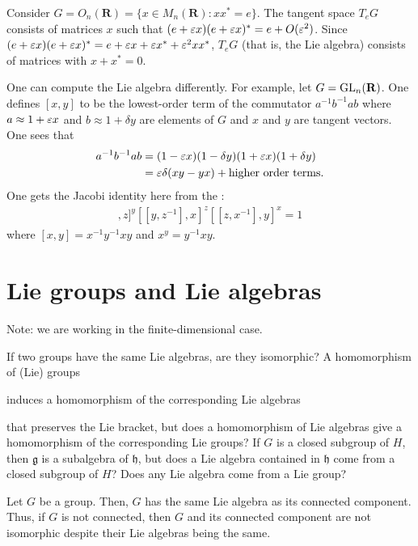 \documentclass [11 pt, twoside] {article}
\begin{document}
\begin{example}[ ]\label{}\text{}
Consider $G = O_{n}(\mathbf{R}) = \{x\in M_{n}(\mathbf{R}) : xx^{*}=e\}$. 
The tangent space $T_{e}G$ consists of matrices $x$ such that $(e+\varepsilon x)(e+\varepsilon x) ^{*}=  e + O(\varepsilon^{2})$.
Since $(e+\varepsilon x) (e+\varepsilon x) ^{*} = e + \varepsilon x + \varepsilon x ^{*} + \varepsilon ^{2}xx^{*}$, $T_{e}G$ (that is, the Lie algebra) consists of matrices with $x+x^{*}=0$.
\end{example}

One can compute the Lie algebra differently.
For example, let $G=\operatorname{GL}_{n}(\mathbf{R})$.
One defines $[x,y]$ to be the lowest-order term of the commutator $a^{-1}b^{-1}ab$ where $a\approx 1+\varepsilon x$ and $b\approx 1+\delta y$ are elements of $G$ and $x$ and $y$ are tangent vectors. 
One sees that
\begin{align*}
	a^{-1}b^{-1}ab &= (1-\varepsilon x) (1-\delta y)  (1+\varepsilon x) (1+\delta y)\\
		       &= \varepsilon\delta (xy-yx) + \textrm{higher order terms.}
\end{align*}
One gets the Jacobi identity here from the :
\begin{align*}
	[[x,y^{-1}],z]^{y}[[y,z^{-1}],x]^{z}[[z,x^{-1}],y]^{x} = 1
\end{align*}
where $[x,y] = x^{-1}y^{-1}xy$ and $x^{y}=y^{-1}xy$.
\fi


\section {Lie groups and Lie algebras}
Note: we are working in the finite-dimensional case.

If two groups have the same Lie algebras, are they isomorphic?
A homomorphism of (Lie) groups 
induces a homomorphism of the corresponding Lie algebras 
that preserves the Lie bracket, but does a homomorphism of Lie algebras give a homomorphism of the corresponding Lie groups?
If $G$ is a closed subgroup of $H$, then $\mathfrak{g}$ is a subalgebra of $\mathfrak{h}$, but does a Lie algebra contained in $\mathfrak{h}$ come from a closed subgroup of $H$?
Does any Lie algebra come from a Lie group?

\begin{example}[ ]\label{}\text{}
Let $G$ be a group. Then, $G$ has the same Lie algebra as its connected component. Thus, if $G$ is not connected, then $G$ and its connected component are not isomorphic despite their Lie algebras being the same.
\end{example}
\end{document}

